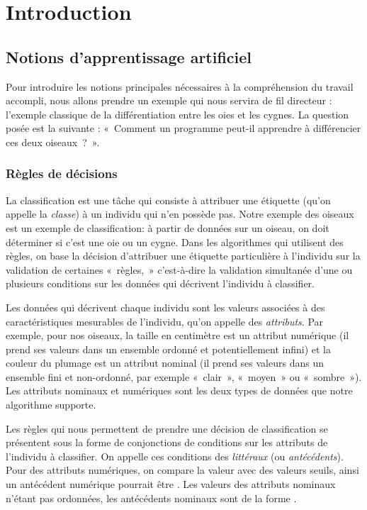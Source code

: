\section{Introduction}

    \subsection{Notions d'apprentissage artificiel}

        Pour introduire les notions principales nécessaires à la compréhension du travail accompli, nous allons prendre un exemple qui nous servira de fil directeur : l’exemple classique de la différentiation entre les oies et les cygnes. La question posée est la suivante : «~Comment un programme peut-il apprendre à différencier ces deux oiseaux~?~».

        \subsubsection{Règles de décisions}

            La classification est une tâche qui consiste à attribuer une étiquette (qu'on appelle la \emph{classe}) à un individu qui n'en possède pas. Notre exemple des oiseaux est un exemple de classification: à partir de données sur un oiseau, on doit déterminer si c'est une oie ou un cygne. Dans les algorithmes qui utilisent des règles, on base la décision d'attribuer une étiquette particulière à l'individu sur la validation de certaines «~règles,~» c'est-à-dire la validation simultanée d'une ou plusieurs conditions sur les données qui décrivent l'individu à classifier.

            Les données qui décrivent chaque individu sont les valeurs associées à des caractéristiques mesurables de l'individu, qu'on appelle des \emph{attributs}. Par exemple, pour nos oiseaux, la taille en centimètre est un attribut numérique (il prend ses valeurs dans un ensemble ordonné et potentiellement infini) et la couleur du plumage est un attribut nominal (il prend ses valeurs dans un ensemble fini et non-ordonné, par exemple «~clair~», «~moyen~» ou «~sombre~»). Les attributs nominaux et numériques sont les deux types de données que notre algorithme supporte.

            Les règles qui nous permettent de prendre une décision de classification se présentent sous la forme de conjonctions de conditions sur les attributs de l'individu à classifier. On appelle ces conditions des \emph{littéraux} (ou \emph{antécédents}). Pour des attributs numériques, on compare la valeur avec des valeurs seuils, ainsi un antécédent numérique pourrait être . Les valeurs des attributs nominaux n'étant pas ordonnées, les antécédents nominaux sont de la forme .

